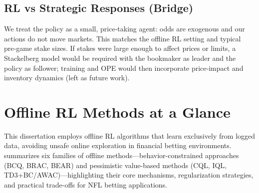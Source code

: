 
\subsection{RL vs Strategic Responses (Bridge)}
We treat the policy as a small, price‑taking agent: odds are exogenous and our actions do not move markets. This matches the offline RL setting and typical pre‑game stake sizes. If stakes were large enough to affect prices or limits, a Stackelberg model would be required with the bookmaker as leader and the policy as follower; training and OPE would then incorporate price‑impact and inventory dynamics (left as future work).

\section{Offline RL Methods at a Glance}
This dissertation employs offline RL algorithms that learn exclusively from logged data, avoiding unsafe online exploration in financial betting environments.  summarizes six families of offline methods—behavior-constrained approaches (BCQ, BRAC, BEAR) and pessimistic value-based methods (CQL, IQL, TD3+BC/AWAC)—highlighting their core mechanisms, regularization strategies, and practical trade-offs for NFL betting applications.


